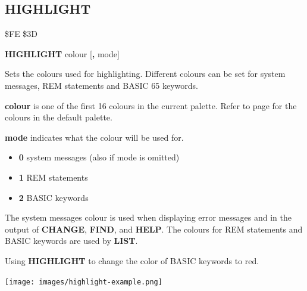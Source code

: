 
\newpage
\subsection{HIGHLIGHT}
\begin{description}[leftmargin=2cm,style=nextline]
\item [Token:] \$FE \$3D
\item [Format:] {\bf HIGHLIGHT} colour [{\bf,} mode]
\item [Usage:] Sets the colours used for highlighting. Different colours can be
                set for system messages, REM statements and BASIC 65 keywords.

                {\bf colour} is one of the first 16 colours in the current palette.
                Refer to page \pageref{colourtable} for the colours in the
                default palette.

                {\bf mode} indicates what the colour will be used for.
                \begin{itemize}
                    \item {\bf 0} system messages (also if mode is omitted)
                    \item {\bf 1} REM statements
                    \item {\bf 2} BASIC keywords
                \end{itemize}

\item [Remarks:] The system messages colour is used when displaying error
                messages and in the output of {\bf CHANGE}, {\bf FIND}, and
                {\bf HELP}. The colours for REM statements and BASIC keywords
                are used by {\bf LIST}.
\item [Example:] Using {\bf HIGHLIGHT} to change the color of BASIC keywords to red.
\item \begin{center}\texttt{[image: images/highlight-example.png]}\end{center}
\end{description}


\newpage
